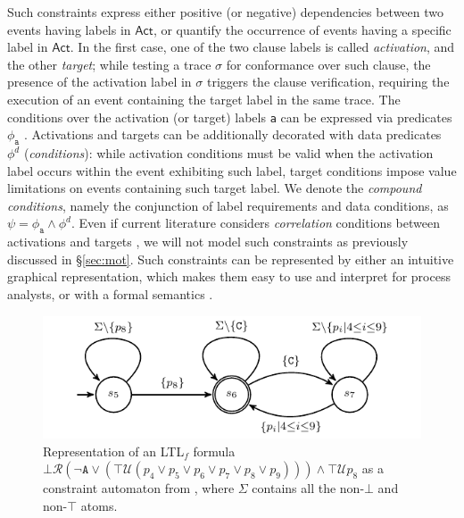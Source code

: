  Such constraints express either positive (or negative) dependencies between two events having labels in $\textsf{Act}$, or quantify the occurrence of events having a specific label in $\textsf{Act}$. In the first case, one of the two clause labels is called \textit{activation}, and the other \textit{target}; while testing a trace $\sigma$ for conformance over such clause, the presence of the activation label in $\sigma$ triggers the clause verification, requiring the execution of an event containing the target label in the same trace. The conditions over the activation (or target) labels \texttt{a} can be expressed via predicates $\phi_{\texttt{a}}$ \cite{SchonigCMM16,LenoDM18}. Activations and targets can be additionally decorated with  data predicates $\phi^d$ (\textit{conditions}): while activation conditions must be valid when the activation label occurs within the event exhibiting such label, target conditions impose value limitations on events containing such target label. We denote the \textit{compound conditions}, namely the conjunction of label requirements and data conditions, as $\psi=\phi_{\texttt{a}}\wedge \phi^d$.  Even if current literature  considers \textit{correlation} conditions between activations and targets \cite{SchonigCMM16}, we will not model such constraints as previously discussed in \S\ref{sec:mot}. Such constraints can be represented by either an intuitive graphical representation, which makes them easy to use and interpret for process analysts, or with a formal semantics \cite{LeoniMA12}.

\begin{figure}[!t]
	\centering
%
\includegraphics[scale=0.9]{images/example_3_graph}
	\caption{Representation of an LTL$_f$ formula $\bot\mathcal{R}(\neg\texttt{A}\vee(\top\mathcal{U}(p_4\vee p_5\vee p_6\vee p_7\vee p_8\vee p_9)))\wedge\top\mathcal{U} p_8$  as a constraint automaton from \cite{LeoniMA12,Westergaard11}, where $\Sigma$ contains all the non-$\bot$ and non-$\top$ atoms.}
	\label{fig:g1g2}
\end{figure}

